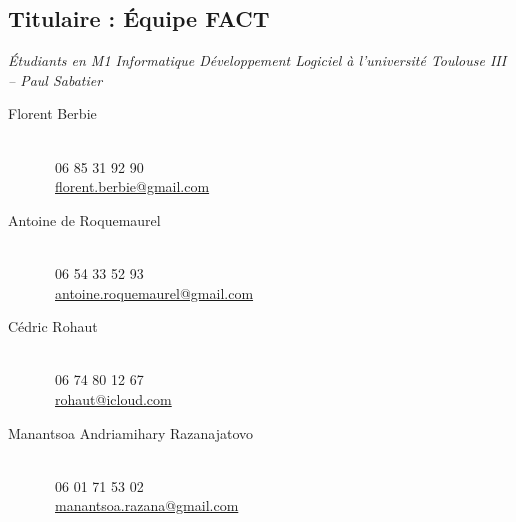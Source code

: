 	\subsection{Titulaire : Équipe FACT}
	\textit{Étudiants en M1 Informatique Développement Logiciel à l'université Toulouse III -- Paul Sabatier}
	\begin{description}
		\item[Florent Berbie]~ \\
	\Telefon~06 85 31 92 90 \\
	\Letter~\href{mailto:florent.berbie@gmail.com}{florent.berbie@gmail.com} \\
	
\item[Antoine de Roquemaurel] ~\\
	\Telefon~06 54 33 52 93\\
	\Letter~\href{mailto:antoine.roquemaurel@gmail.com}{antoine.roquemaurel@gmail.com} \\
	
\item[Cédric Rohaut]~\\ 
	\Telefon~06 74 80 12 67\\
	\Letter~\href{mailto:rohaut@icloud.com}{rohaut@icloud.com} \\
	
\item[Manantsoa Andriamihary Razanajatovo] ~\\
	\Telefon~06 01 71 53 02\\
	\Letter~\href{mailto:manantsoa.razana@gmail.com}{manantsoa.razana@gmail.com}
\end{description}




